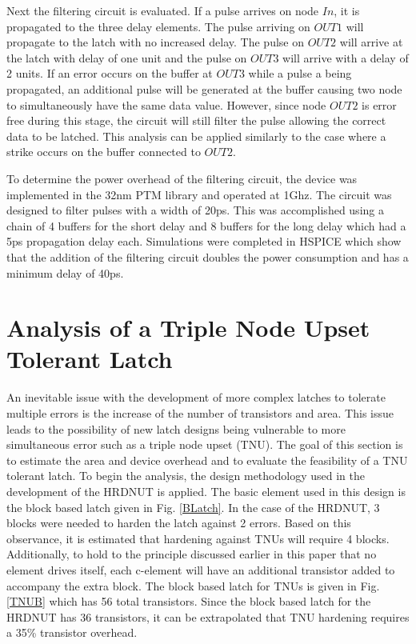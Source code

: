 Next the filtering circuit is evaluated. If a pulse arrives on node $In$, it is propagated to the three delay elements. The pulse arriving on $OUT1$ will propagate to the latch with no increased delay. The pulse on $OUT2$ will arrive at the latch with delay of one unit and the pulse on $OUT3$ will arrive with a delay of 2 units. If an error occurs on the buffer at $OUT3$ while a pulse a being propagated, an additional pulse will be generated at the buffer causing two node to simultaneously have the same data value. However, since node $OUT2$ is error free during this stage, the circuit will still filter the pulse allowing the correct data to be latched. This analysis can be applied similarly to the case where a strike occurs on the buffer connected to $OUT2$.

To determine the power overhead of the filtering circuit, the device was implemented in the 32nm PTM library and operated at 1Ghz. The circuit was designed to filter pulses with a width of 20ps. This was accomplished using a chain of 4 buffers for the short delay and 8 buffers for the long delay which had a 5ps propagation delay each. Simulations were completed in HSPICE which show that the addition of the filtering circuit doubles the power consumption and has a minimum delay of 40ps.

\section{Analysis of a Triple Node Upset Tolerant Latch}
An inevitable issue with the development of more complex latches to tolerate multiple errors is the increase of the number of transistors and area. This issue leads to the possibility of new latch designs being vulnerable to more simultaneous error such as a triple node upset (TNU). The goal of this section is to estimate the area and device overhead and to evaluate the feasibility of a TNU tolerant latch. To begin the analysis, the design methodology used in the development of the HRDNUT is applied. The basic element used in this design is the block based latch given in Fig. \ref{BLatch}. In the case of the HRDNUT, 3 blocks were needed to harden the latch against 2 errors. Based on this observance, it is estimated that hardening against TNUs will require 4 blocks. Additionally, to hold to the principle discussed earlier in this paper that no element drives itself, each c-element will have an additional transistor added to accompany the extra block. The block based latch for TNUs is given in Fig. \ref{TNUB} which has 56 total transistors. Since the block based latch for the HRDNUT has 36 transistors, it can be extrapolated that TNU hardening requires a 35\% transistor overhead.

